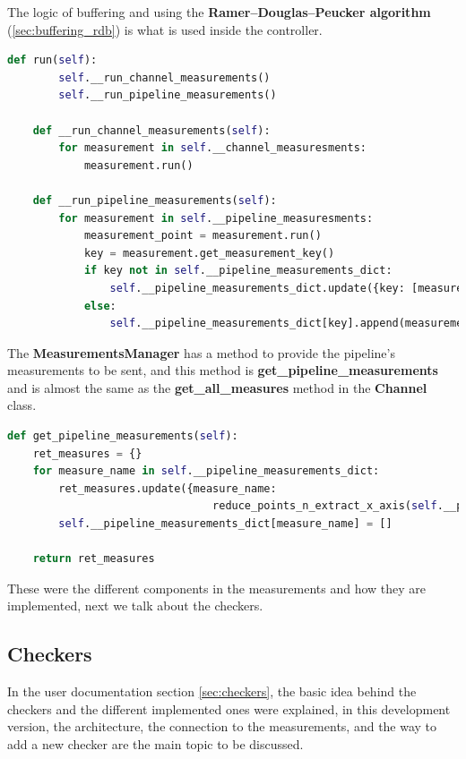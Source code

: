 The logic of buffering and using the \textbf{Ramer–Douglas–Peucker algorithm} (\ref{sec:buffering_rdb}) 
is what is used inside the controller.
\newline
\begin{lstlisting}[language=Python, caption={Measurements running},captionpos=b]
	def run(self):
		self.__run_channel_measurements()
		self.__run_pipeline_measurements()
	
	def __run_channel_measurements(self):
		for measurement in self.__channel_measuresments:
			measurement.run()
	
	def __run_pipeline_measurements(self):
		for measurement in self.__pipeline_measuresments:
			measurement_point = measurement.run()
			key = measurement.get_measurement_key()
			if key not in self.__pipeline_measurements_dict:
				self.__pipeline_measurements_dict.update({key: [measurement_point]})
			else:
				self.__pipeline_measurements_dict[key].append(measurement_point)
\end{lstlisting}

The \textbf{MeasurementsManager} has a method to provide the pipeline's measurements to be sent, and this
method is \textbf{get\_pipeline\_measurements} and is almost the same as the \textbf{get\_all\_measures} method
in the \textbf{Channel} class.
\newline
\begin{lstlisting}[language=Python, caption={Providing the pipeline's measurements},captionpos=b]
def get_pipeline_measurements(self):
	ret_measures = {}
	for measure_name in self.__pipeline_measurements_dict:
		ret_measures.update({measure_name:
								reduce_points_n_extract_x_axis(self.__pipeline_measurements_dict[measure_name])})
		self.__pipeline_measurements_dict[measure_name] = []

	return ret_measures
\end{lstlisting}

These were the different components in the measurements and how they are
implemented, next we talk about the checkers.

\subsection{Checkers}
In the user documentation section \ref{sec:checkers}, the basic idea behind the checkers and the different
implemented ones were explained, in this development version, the architecture, the connection
to the measurements, and the way to add a new checker are the main topic to be discussed.

